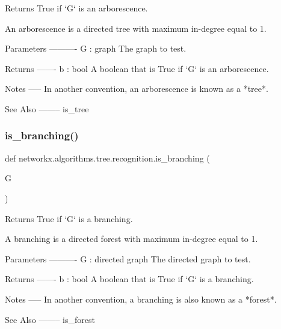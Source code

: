 \begin{DoxyVerb}Returns True if `G` is an arborescence.

An arborescence is a directed tree with maximum in-degree equal to 1.

Parameters
----------
G : graph
    The graph to test.

Returns
-------
b : bool
    A boolean that is True if `G` is an arborescence.

Notes
-----
In another convention, an arborescence is known as a *tree*.

See Also
--------
is_tree\end{DoxyVerb}
 \mbox{\label{namespacenetworkx_1_1algorithms_1_1tree_1_1recognition_ae93ee5537aae537d550b1fadc2eaf992}} 
\subsubsection{\texorpdfstring{is\+\_\+branching()}{is\_branching()}}
{\footnotesize\ttfamily def networkx.\+algorithms.\+tree.\+recognition.\+is\+\_\+branching (\begin{DoxyParamCaption}\item[{}]{G }\end{DoxyParamCaption})}

\begin{DoxyVerb}Returns True if `G` is a branching.

A branching is a directed forest with maximum in-degree equal to 1.

Parameters
----------
G : directed graph
    The directed graph to test.

Returns
-------
b : bool
    A boolean that is True if `G` is a branching.

Notes
-----
In another convention, a branching is also known as a *forest*.

See Also
--------
is_forest\end{DoxyVerb}
 \mbox{\label{namespacenetworkx_1_1algorithms_1_1tree_1_1recognition_afa313295940a819b7b46b485062d9eab}} 
